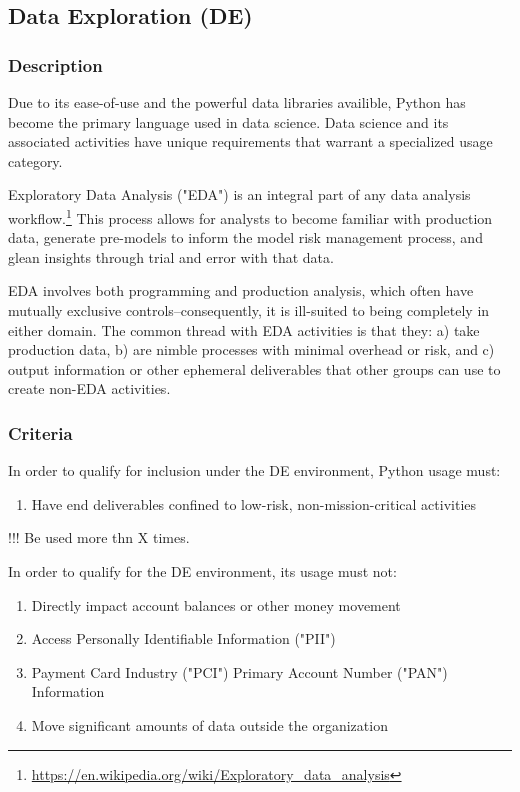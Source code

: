	\subsection{Data Exploration (DE)}

		\subsubsection{Description}

			Due to its ease-of-use and the powerful data libraries availible, Python has become the primary language used in data science. Data science and its associated activities have unique requirements that warrant a specialized usage category. 

			Exploratory Data Analysis ("EDA") is an integral part of any data analysis workflow.\footnote{\url{https://en.wikipedia.org/wiki/Exploratory_data_analysis}} This process allows for analysts to become familiar with production data, generate pre-models to inform the model risk management process, and glean insights through trial and error with that data. 

			EDA involves both programming and production analysis, which often have mutually exclusive controls--consequently, it is ill-suited to being completely in either domain. The common thread with EDA activities is that they: a) take production data, b) are nimble processes with minimal overhead or risk, and c) output information or other ephemeral deliverables that other groups can use to create non-EDA activities.

		\subsubsection{Criteria}

			In order to qualify for inclusion under the DE environment, Python usage must:

			\begin{enumerate}
        		\item Have end deliverables confined to low-risk, non-mission-critical activities
        		\
        	\end{enumerate}


        	!!! Be used more thn X times.

			In order to qualify for the DE environment, its usage must not:

			\begin{enumerate}
        		\item Directly impact account balances or other money movement
        		\item Access Personally Identifiable Information ("PII")
        		\item Payment Card Industry ("PCI") Primary Account Number ("PAN") Information
        		\item Move significant amounts of data outside the organization
        	\end{enumerate}


